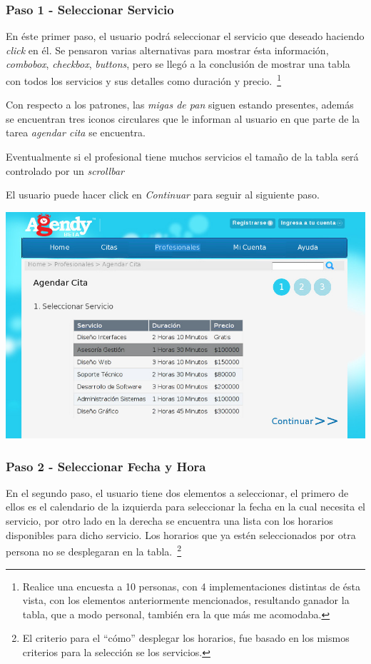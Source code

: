 \documentclass[letter, 10pt]{article}
\begin{document}
\subsubsection{Paso 1 - Seleccionar Servicio}

En éste primer paso, el usuario podrá seleccionar el servicio que deseado haciendo \emph{click} en él.
Se pensaron varias alternativas para mostrar ésta información, \emph{combobox}, \emph{checkbox}, \emph{buttons},
pero se llegó a la conclusión de mostrar una tabla con todos los servicios y sus detalles como duración y precio.~\footnote{
Realice una encuesta a 10 personas, con 4 implementaciones distintas de ésta vista, con los elementos anteriormente mencionados,
resultando ganador la tabla, que a modo personal, también era la que más me acomodaba.}

Con respecto a los patrones, las \emph{migas de pan} siguen estando presentes, además se encuentran tres iconos circulares
que le informan al usuario en que parte de la tarea \emph{agendar cita} se encuentra.

Eventualmente si el profesional tiene muchos servicios el tamaño de la tabla será controlado por un \emph{scrollbar}

El usuario puede hacer click en \emph{Continuar} para seguir al siguiente paso.

\begin{center}
	\includegraphics[width=18cm]{images/3_1}
\end{center}
\newpage
\subsubsection{Paso 2 - Seleccionar Fecha y Hora}
En el segundo paso, el usuario tiene dos elementos a seleccionar,
el primero de ellos es el calendario de la izquierda para seleccionar la fecha en la cual necesita el servicio,
por otro lado en la derecha se encuentra una lista con los horarios disponibles para dicho servicio.
Los horarios que ya estén seleccionados por otra persona no se desplegaran en la tabla.~\footnote{El criterio para el ``cómo'' desplegar los horarios,
fue basado en los mismos criterios para la selección se los servicios.}
\end{document}
